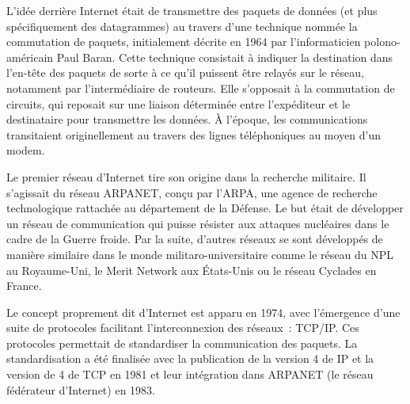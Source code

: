 
L'idée derrière Internet était de transmettre des paquets de données (et plus spécifiquement des datagrammes) au travers d'une technique nommée la commutation de paquets, initialement décrite en 1964 par l'informaticien polono-américain Paul Baran. Cette technique consistait à indiquer la destination dans l'en-tête des paquets de sorte à ce qu'il puissent être relayés sur le réseau, notamment par l'intermédiaire de routeurs. Elle s'opposait à la commutation de circuits, qui reposait sur une liaison déterminée entre l'expéditeur et le destinataire pour transmettre les données. À l'époque, les communications transitaient originellement au travers des lignes téléphoniques au moyen d'un modem.


Le premier réseau d'Internet tire son origine dans la recherche militaire. Il s'agissait du réseau ARPANET, conçu par l'ARPA, une agence de recherche technologique rattachée au département de la Défense. Le but était de développer un réseau de communication qui puisse résister aux attaques nucléaires dans le cadre de la Guerre froide. Par la suite, d'autres réseaux se sont développés de manière similaire dans le monde militaro-universitaire comme le réseau du NPL au Royaume-Uni, le Merit Network aux États-Unis ou le réseau Cyclades en France.

Le concept proprement dit d'Internet est apparu en 1974, avec l'émergence d'une suite de protocoles facilitant l'interconnexion des réseaux~: TCP/IP. Ces protocoles permettait de standardiser la communication des paquets. La standardisation a été finalisée avec la publication de la version 4 de IP et la version de 4 de TCP en 1981 et leur intégration dans ARPANET (le réseau fédérateur d'Internet) en 1983.

